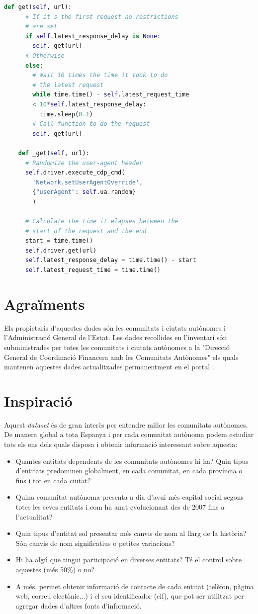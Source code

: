 \documentclass[12pt]{article}
\begin{document}
\noindent\begin{lstlisting}[language=Python]
    def get(self, url):
      # If it's the first request no restrictions 
      # are set
      if self.latest_response_delay is None:
        self._get(url)
      # Otherwise
      else:
        # Wait 10 times the time it took to do 
        # the latest request
        while time.time() - self.latest_request_time
        < 10*self.latest_response_delay:
          time.sleep(0.1)
        # Call function to do the request
        self._get(url)

    def _get(self, url):
      # Randomize the user-agent header
      self.driver.execute_cdp_cmd(
        'Network.setUserAgentOverride', 
        {"userAgent": self.ua.random}
        )

      # Calculate the time it elapses between the 
      # start of the request and the end
      start = time.time()
      self.driver.get(url)
      self.latest_response_delay = time.time() - start
      self.latest_request_time = time.time()
\end{lstlisting}




\section*{Agraïments}
Els propietaris d'aquestes dades són les comunitats i ciutats autònomes i l'Administració General de l'Estat. Les dades recollides en l'inventari són subministrades per totes les comunitats i ciutats autònomes a la "Direcció General de Coordinació Financera amb les Comunitats Autònomes" els quals mantenen aquestes dades actualitzades permanentment en el portal \cite{PDFAjuda}.

\section*{Inspiració}
Aquest \textit{dataset} és de gran interès per entendre millor les comunitats autònomes. De manera global a tota Espanya i per cada comunitat autònoma podem estudiar tots els ens dels quals disposa i obtenir informació interessant sobre aquesta:
\begin{itemize}
    \item Quantes entitats dependents de les comunitats autònomes hi ha? Quin tipus d'entitats predominen globalment, en cada comunitat, en cada província o fins i tot en cada ciutat?
    \item Quina comunitat autònoma presenta a dia d'avui més capital social segons totes les seves entitats i com ha anat evolucionant des de 2007 fins a l'actualitat?
    \item Quin tipus d'entitat sol presentar més canvis de nom al llarg de la història? Són canvis de nom significatius o petites variacions?
    \item Hi ha algú que tingui participació en diverses entitats? Té el control sobre aquestes (més 50\%) o no?
    \item A més, permet obtenir informació de contacte de cada entitat (telèfon, pàgina web, correu electònic...) i el seu identificador (cif), que pot ser utilitzat per agregar dades d'altres fonts d'informació.
\end{itemize}
\end{document}
